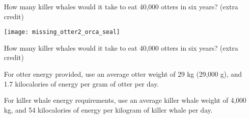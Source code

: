 \documentclass[t,handout]{beamer}  %
\begin{document}
%
\begin{frame}[t]{How many killer whales would it take to eat 40,000 otters in six years? (extra credit)}

	\texttt{[image: missing\_otter2\_orca\_seal]}

\end{frame}
%
\begin{frame}[t]{How many killer whales would it take to eat 40,000 otters in six years? (extra credit)}

	\hangpara For otter energy provided, use \newline	
	\hspace*{1em} an average otter weight of 29 kg (29,000 g), and \newline
	\hspace*{1em} 1.7 kilocalories of energy per gram of otter per day.

	\hangpara For killer whale energy requirements, use \newline
	\hspace*{1em} an average killer whale weight of 4,000 kg, and \newline
	\hspace*{1em} 54 kilocalories of energy per kilogram of killer whale per day.

\end{frame}
%
\end{document}
